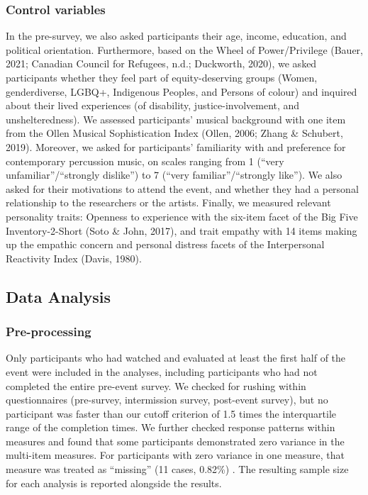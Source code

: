 \documentclass[
  man,floatsintext]{apa6}
\begin{document}
\subsubsection{Control variables}\label{control-variables}

In the pre-survey, we also asked participants their age, income, education, and political orientation. Furthermore, based on the Wheel of Power/Privilege (Bauer, 2021; Canadian Council for Refugees, n.d.; Duckworth, 2020), we asked participants whether they feel part of equity-deserving groups (Women, genderdiverse, LGBQ+, Indigenous Peoples, and Persons of colour) and inquired about their lived experiences (of disability, justice-involvement, and unshelteredness). We assessed participants' musical background with one item from the Ollen Musical Sophistication Index (Ollen, 2006; Zhang \& Schubert, 2019). Moreover, we asked for participants' familiarity with and preference for contemporary percussion music, on scales ranging from 1 (``very unfamiliar''/``strongly dislike'') to 7 (``very familiar''/``strongly like''). We also asked for their motivations to attend the event, and whether they had a personal relationship to the researchers or the artists. Finally, we measured relevant personality traits: Openness to experience with the six-item facet of the Big Five Inventory-2-Short (Soto \& John, 2017), and trait empathy with 14 items making up the empathic concern and personal distress facets of the Interpersonal Reactivity Index (Davis, 1980).

\subsection{Data Analysis}\label{data-analysis}

\subsubsection{Pre-processing}\label{pre-processing}

Only participants who had watched and evaluated at least the first half of the event were included in the analyses, including participants who had not completed the entire pre-event survey. We checked for rushing within questionnaires (pre-survey, intermission survey, post-event survey), but no participant was faster than our cutoff criterion of 1.5 times the interquartile range of the completion times. We further checked response patterns within measures and found that some participants demonstrated zero variance in the multi-item measures. For participants with zero variance in one measure, that measure was treated as ``missing'' (11 cases, 0.82\%) . The resulting sample size for each analysis is reported alongside the results.
\end{document}
